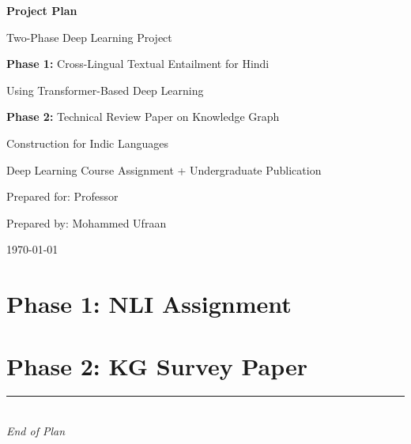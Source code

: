 \documentclass[11pt,a4paper]{article}
\begin{document}
\begin{titlepage}
    \centering
    \vspace*{2cm}
    {\Huge\bfseries Project Plan\par}
    \vspace{0.5cm}
    {\LARGE Two-Phase Deep Learning Project\par}
    \vspace{1cm}
    {\Large\textbf{Phase 1:} Cross-Lingual Textual Entailment for Hindi\par}
    {\Large Using Transformer-Based Deep Learning\par}
    \vspace{0.7cm}
    {\Large\textbf{Phase 2:} Technical Review Paper on Knowledge Graph\par}
    {\Large Construction for Indic Languages\par}
    \vspace{1.5cm}
    {\large Deep Learning Course Assignment + Undergraduate Publication\par}
    \vspace{0.5cm}
    {\large Prepared for: Professor}\par
    \vspace{1cm}
    {\large Prepared by: Mohammed Ufraan}\par
    \vspace{0.5cm}
    {\large \today}\par
    \vfill
\end{titlepage}

\tableofcontents
\newpage
{}
\setcounter{page}{1}







\part{Phase 1: NLI Assignment}



\part{Phase 2: KG Survey Paper}







\vfill
\begin{center}
\rule{0.5\textwidth}{0.5pt}\\
\textit{End of Plan}
\end{center}
\end{document}
